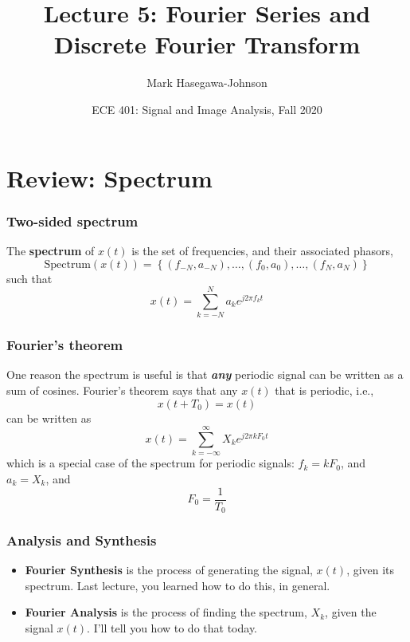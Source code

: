 \documentclass{beamer}
\title{Lecture 5: Fourier Series and Discrete Fourier Transform}
\author{Mark Hasegawa-Johnson}
\date{ECE 401: Signal and Image Analysis, Fall 2020}
\begin{document}
\begin{frame}
  \maketitle
\end{frame}

\begin{frame}
  \tableofcontents
\end{frame}

\section[Review]{Review: Spectrum}
\setcounter{subsection}{1}

\begin{frame}
  \frametitle{Two-sided spectrum}

  The {\bf spectrum} of $x(t)$ is the set of frequencies, and their
  associated phasors,
  \[
  \mbox{Spectrum}\left( x(t) \right) =
  \left\{ (f_{-N},a_{-N}), \ldots, (f_0,a_0), \ldots, (f_N,a_N) \right\}
  \]
  such that
  \[
  x(t) = \sum_{k=-N}^N a_ke^{j2\pi f_kt}
  \]
\end{frame}

\begin{frame}
  \frametitle{Fourier's theorem}

  One reason the spectrum is useful is that {\bf\em any} periodic
  signal can be written as a sum of cosines.  Fourier's theorem says that
  any $x(t)$ that is periodic, i.e.,
  \[
  x(t+T_0) = x(t)
  \]
  can be written as
  \[
  x(t) = \sum_{k=-\infty}^\infty X_k e^{j2\pi k F_0 t}
  \]
  which is a special case of the spectrum for periodic signals:
  $f_k=kF_0$, and $a_k=X_k$, and
  \[
  F_0 = \frac{1}{T_0}
  \]
\end{frame}

\begin{frame}
  \frametitle{Analysis and Synthesis}

  \begin{itemize}
  \item {\bf Fourier Synthesis} is the process of generating the
    signal, $x(t)$, given its spectrum.  Last lecture, you learned
    how to do this, in general.
  \item {\bf Fourier Analysis} is the process of finding the spectrum,
    $X_k$, given the signal $x(t)$.  I'll tell you how to do that today.
  \end{itemize}
\end{frame}
\end{document}
